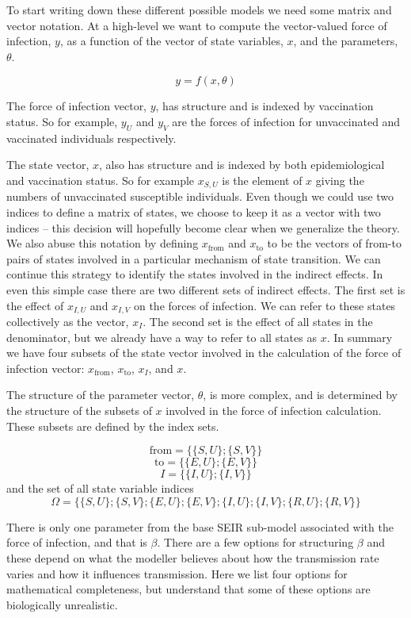\documentclass{article}
\theoremstyle{definition}
\begin{document}
To start writing down these different possible models we need some matrix and vector notation. At a high-level we want to compute the vector-valued force of infection, $y$, as a function of the vector of state variables, $x$, and the parameters, $\theta$.

$$
y = f(x, \theta)
$$

The force of infection vector, $y$, has structure and is indexed by vaccination status. So for example, $y_U$ and $y_V$ are the forces of infection for unvaccinated and vaccinated individuals respectively.

The state vector, $x$, also has structure and is indexed by both epidemiological and vaccination status. So for example $x_{S,U}$ is the element of $x$ giving the numbers of unvaccinated susceptible individuals. Even though we could use two indices to define a matrix of states, we choose to keep it as a vector with two indices -- this decision will hopefully become clear when we generalize the theory. We also abuse this notation by defining $x_{\text{from}}$ and $x_{\text{to}}$ to be the vectors of from-to pairs of states involved in a particular mechanism of state transition. We can continue this strategy to identify the states involved in the indirect effects. In even this simple case there are two different sets of indirect effects. The first set is the effect of $x_{I,U}$ and $x_{I,V}$ on the forces of infection. We can refer to these states collectively as the vector, $x_I$. The second set is the effect of all states in the denominator, but we already have a way to refer to all states as $x$. In summary we have four subsets of the state vector involved in the calculation of the force of infection vector: $x_{\text{from}}$, $x_{\text{to}}$, $x_I$, and $x$.

The structure of the parameter vector, $\theta$, is more complex, and is determined by the structure of the subsets of $x$ involved in the force of infection calculation. These subsets are defined by the index sets. 

$$
\text{from} = \{\{S,U\};\{S,V\}\}
$$
$$
\text{to} = \{\{E,U\};\{E,V\}\}
$$
$$
I = \{\{I,U\};\{I,V\}\}
$$
and the set of all state variable indices
$$
\Omega = \{\{S,U\};\{S,V\};\{E,U\};\{E,V\};\{I,U\};\{I,V\};\{R,U\};\{R,V\}\}
$$

There is only one parameter from the base SEIR sub-model associated with the force of infection, and that is $\beta$. There are a few options for structuring $\beta$ and these depend on what the modeller believes about how the transmission rate varies and how it influences transmission. Here we list four options for mathematical completeness, but understand that some of these options are biologically unrealistic.
\end{document}
